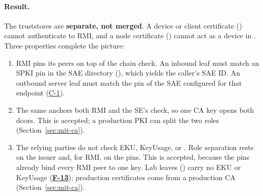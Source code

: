 \documentclass[11pt,a4paper]{article}
\newcommand{\fid}[1]{\textbf{#1}}
\begin{document}
\paragraph{Result.} The truststores are \textbf{separate, not merged}. A device or client certificate () cannot authenticate to RMI, and a node certificate () cannot act as a device in . Three properties complete the picture:
\begin{enumerate}[label=(\alph*)]
\item RMI pins its peers on top of the chain check. An inbound leaf must match an SPKI pin in the SAE directory (), which yields the caller's SAE ID. An outbound server leaf must match the pin of the SAE configured for that endpoint (\hyperref[c:C-1]{C-1}).
\item The same  anchors both RMI and the SE's  check, so one CA key opens both doors. This is accepted; a production PKI can split the two roles (Section~\ref{sec:mit-ca}).
\item The relying parties do not check EKU, KeyUsage, or . Role separation rests on the issuer and, for RMI, on the pins. This is accepted, because the pins already bind every RMI peer to one key. Lab leaves () carry no EKU or KeyUsage (\hyperref[f:F-13]{\fid{F-13}}); production certificates come from a production CA (Section~\ref{sec:mit-ca}).
\end{enumerate}
\end{document}
